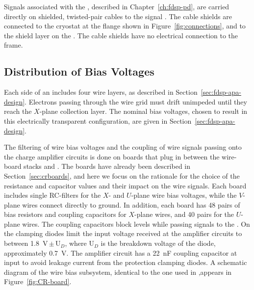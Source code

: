 Signals associated with the , described in 
Chapter~\ref{ch:fdsp-pd}, are carried directly on shielded, 
twisted-pair cables to the signal \fdth. The cable shields 
are connected to the cryostat at the  flange 
shown in Figure~\ref{fig:connections}, and to the  
shield layer on the . The cable shields have no 
electrical connection to the  frame.

\subsection{Distribution of Bias Voltages}
\label{sec:fdsp-tpcelec-design-bias}


Each side of an  includes four wire layers, as 
described in Section~\ref{sec:fdsp-apa-design}. Electrons passing 
through the wire grid must drift unimpeded until they reach 
the $X$-plane collection layer. The nominal bias voltages, chosen %
to result in this electrically transparent configuration, %
are given in Section~\ref{sec:fdsp-apa-design}. 

The filtering of wire bias voltages and the  coupling 
of wire signals passing onto the charge amplifier circuits is 
done on  boards that plug in between the  
wire-board stacks and . The  boards
have already been described in Section~\ref{sec:crboards},
and here we focus on the rationale for the choice of the %
resistance and capacitor values and their impact on the
wire signals. Each  board includes single RC-filters 
for the $X$- and $U$-plane wire bias voltages, while the $V$-plane 
wires connect directly %
to ground. In addition, each board 
has \num{48} pairs of bias resistors and  coupling 
capacitors for $X$-plane wires, and \num{40} pairs for the $U$-plane 
wires. The coupling capacitors block  levels while passing  
signals to the . On the  %
clamping
diodes %
limit the input voltage received at the amplifier
circuits to between \SI{1.8}{V}\,$\pm$\,U$_D$, where U$_D$
is the breakdown voltage of the diode, approximately \SI{0.7}{V}.
The amplifier circuit has a \SI{22}{nF} coupling capacitor at
input to avoid leakage current from the protection clamping diodes.
A schematic diagram of the   wire bias 
subsystem, identical to the one used in ,appears  %
in Figure~\ref{fig:CR-board}.

